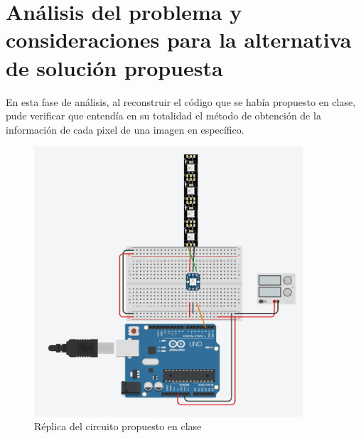 \documentclass{article}
\begin{document}
 \section{Análisis del problema y consideraciones para la alternativa de solución propuesta}
 En esta fase de análisis, al reconstruir el código que se había propuesto en clase, pude verificar que entendía en su totalidad el método de obtención de la información de cada pixel de una imagen en específico.
 \begin{figure}[h]
    \includegraphics[width=10cm]{circ_pruebainicial.png}
    \centering
    \caption{Réplica del circuito propuesto en clase}
    \label{fig:replica_circInicial}
 \end{figure}
\end{document}
